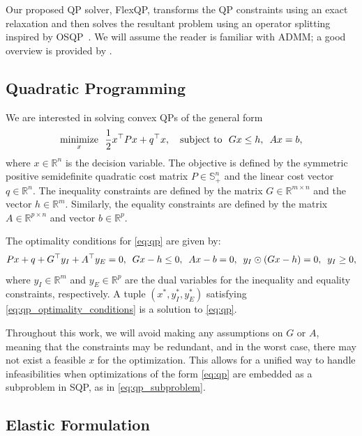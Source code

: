 \documentclass{article} %
\def\sR{{\mathbb{R}}}
\def\sS{{\mathbb{S}}}
\newcommand{\R}{\mathbb{R}}
\DeclareMathOperator*{\minimize}{minimize}
\DeclareMathOperator*{\st}{subject\ to}
\newcommand{\hquad}{\hspace{0.5em}}
\begin{document}
Our proposed QP solver, FlexQP, transforms the QP constraints using an exact relaxation and then solves the resultant problem using an operator splitting inspired by OSQP~\citep{stellato2020osqp}.
We will assume the reader is familiar with ADMM; a good overview is provided by \citet{boyd2011distributed}.

\subsection{Quadratic Programming}
We are interested in solving convex QPs of the general form
\begin{equation}
    \minimize_x \hquad   \frac{1}{2} x^\top P x + q^\top x, \quad \st \hquad Gx \leq h, \hquad Ax = b, \label{eq:qp}
\end{equation}
where $x \in \sR^n$ is the decision variable. The objective is defined by the symmetric positive semidefinite quadratic cost matrix $P \in \sS_+^n$ and the linear cost vector $q \in \sR^n$. The inequality constraints are defined by the matrix $G \in \sR^{m \times n}$ and the vector $h \in \sR^m$. Similarly, the equality constraints are defined by the matrix $A \in \sR^{p \times n}$ and vector $b \in \sR^p$.

The optimality conditions for \cref{eq:qp} are given by:
\begin{equation} \label{eq:qp_optimality_conditions}
    Px + q + G^\top y_I + A^\top y_E = 0, \hquad Gx - h \leq 0, \hquad Ax - b = 0, \hquad y_I \odot (Gx - h) = 0, \hquad y_I \geq 0,
\end{equation}
where $y_I \in \R^m$ and $y_E \in \R^p$ are the dual variables for the inequality and equality constraints, respectively.
A tuple $(x^*, y_I^*, y_E^*)$ satisfying \cref{eq:qp_optimality_conditions} is a solution to \cref{eq:qp}.

Throughout this work, we will avoid making any assumptions on $G$ or $A$, meaning that the constraints may be redundant, and in the worst case, there may not exist a feasible $x$ for the optimization. This allows for a unified way to handle infeasibilities when optimizations of the form \cref{eq:qp} are embedded as a subproblem in SQP, as in \cref{eq:qp_subproblem}.

\subsection{Elastic Formulation}
\end{document}
